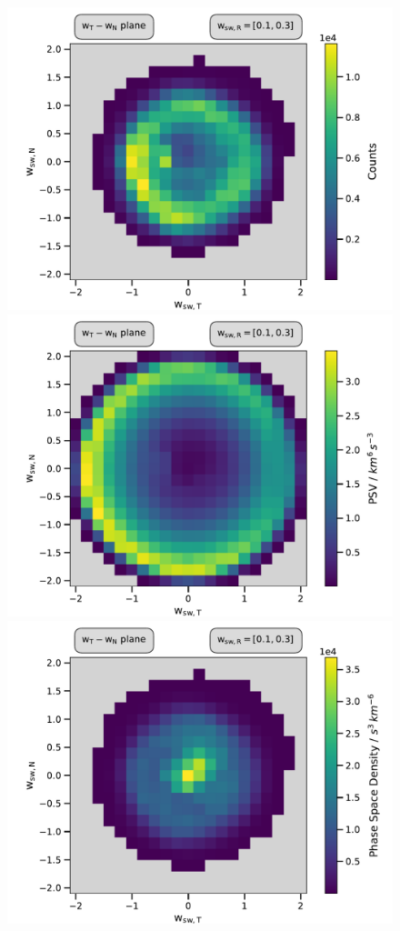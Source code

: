\begin{figure}
\includegraphics[scale=.28]{Figures/cart_lang_R_counts.pdf}
\includegraphics[scale=.28]{Figures/cart_lang_R_norm.pdf}
\includegraphics[scale=.4]{Figures/cart_lang_R_psd.pdf}
\end{figure}



